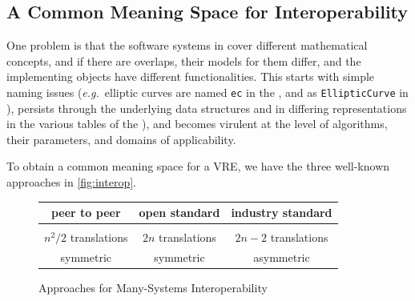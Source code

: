 
\subsection{A Common Meaning Space for Interoperability}

One problem is that the software systems in \ODK cover different mathematical concepts, and
if there are overlaps, their models for them differ, and the implementing objects have
different functionalities.
This starts with simple naming issues (\emph{e.g.}\ elliptic curves are named
\lstinline|ec| in the \LMFDB, and as \lstinline|EllipticCurve| in \Sage), persists through
the underlying data structures
and in differing representations in the various tables of the
\LMFDB), and becomes virulent at the level of algorithms, their parameters, and domains of
applicability.

To obtain a common meaning space for a VRE, we have the three well-known approaches in
\autoref{fig:interop}.
\begin{figure}[ht]\centering
  \begin{tabular}{|c|c|c|}\hline
    peer to peer & open standard & industry standard\\\hline
     &  & \\\hline
    $n^2/2$  translations & $2n$ translations & $2n-2$ translations \\
    symmetric & symmetric & asymmetric\\\hline
  \end{tabular}
  \caption{Approaches for Many-Systems Interoperability}\label{fig:interop}
\end{figure}

